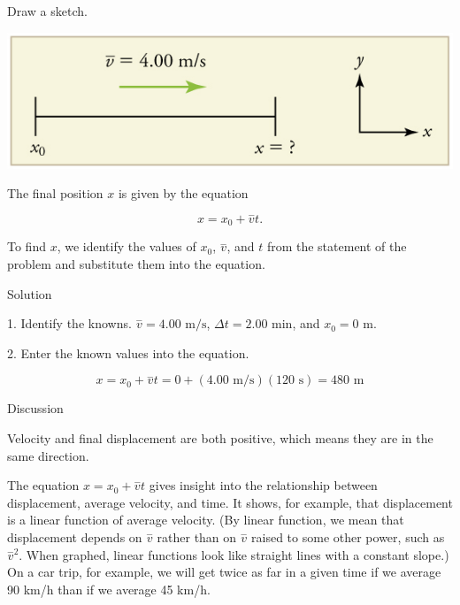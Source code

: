 \documentclass[
]{book}
\newenvironment{tinysection}{}{}
\begin{document}
Draw a sketch.

\includegraphics{images/Figure_02_05_00a.jpg}

The final position \(x{}\) is given by the equation

\leavevmode\hypertarget{import-auto-id2168543}{}%
\[{{{x = {x_{0} + \overset{-}{v}}}t}.}{}\]

To find \(x{}\), we identify the values of \(x_{0}{}\),
\emph{\(\overset{-}{v}{}\)}, and \(t{}\)\emph{} from the
statement of the problem and substitute them into the equation.

\begin{tinysection}

{Solution}

\end{tinysection}

1. Identify the knowns.
\({{\overset{-}{v} = 4}\text{.}\text{00\ m/s}}{}\),
\({{\Delta t = 2}\text{.}\text{00\ min}}{}\), and
\({x_{0} = \text{0\ m}}{}\).\emph{}

2. Enter the known values into the equation.

\leavevmode\hypertarget{import-auto-id2300752}{}%
\[{{x = {x_{0} + \overset{-}{v}}}{t = {0 + \left( {4\text{.}\text{00\ m/s}} \right)}}{\left( \text{120\ s} \right) = \text{480\ m}}}{}\]

\begin{tinysection}

{Discussion}

\end{tinysection}

Velocity and final displacement are both positive, which means they are
in the same direction.

The equation \({{x = {x_{0} + \overset{-}{v}}}t}{}\) gives insight into
the relationship between displacement, average velocity, and time. It
shows, for example, that displacement is a linear function of average
velocity. (By linear function, we mean that displacement depends on
\emph{\(\overset{-}{v}{}\)} rather than on \emph{\(\overset{-}{v}{}\)} raised to some
other power, such as \emph{\({\overset{-}{v}}^{2}{}\)}. When graphed, linear
functions look like straight lines with a constant slope.) On a car
trip, for example, we will get twice as far in a given time if we
average 90 km/h than if we average 45 km/h.
\end{document}
